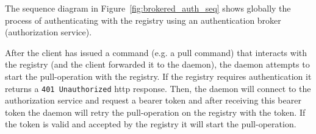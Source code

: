 The sequence diagram in Figure~\ref{fig:brokered_auth_seq} shows globally the process of authenticating with the registry using an authentication broker (authorization service).

After the client has issued a command (e.g. a pull command) that interacts with the registry (and the client forwarded it to the daemon), the daemon attempts to start the pull-operation with the registry. If the registry requires authentication it returns a \texttt{401 Unauthorized} http response. Then, the daemon will connect to the authorization service and request a bearer token and after receiving this bearer token the daemon will retry the pull-operation on the registry with the token. If the token is valid and accepted by the registry it will start the pull-operation.